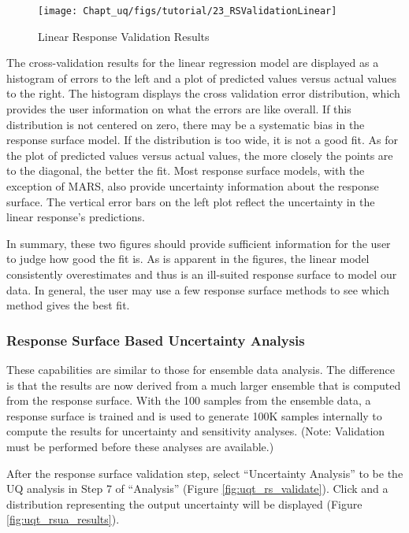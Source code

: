 \begin{figure}[H]
\centering \texttt{[image: Chapt\_uq/figs/tutorial/23\_RSValidationLinear]}
\caption{Linear Response Validation Results}
\label{fig:uqt_rs_validate_results}
\end{figure}

The cross-validation results for the linear regression model are displayed as a histogram of errors to the left and a plot of predicted values versus actual values to the right. The histogram displays the cross validation error distribution, which provides the user information on what the errors are like overall. If this distribution is not centered on zero, there may be a systematic bias in the response surface model. If the distribution is too wide, it is not a good fit. As for the plot of predicted values versus actual values, the more closely the points are to the diagonal, the better the fit. Most response surface models, with the exception of MARS, also provide
uncertainty information about the response surface. The vertical error bars on the left plot reflect the uncertainty in the linear response's predictions.

In summary, these two figures should provide sufficient information for the user to judge how good the fit is. As is apparent in the figures, the linear model consistently overestimates and thus is an ill-suited response surface to model our data. In general, the user may use a few response surface methods to see which method gives the best fit.

\subsubsection{Response Surface Based Uncertainty Analysis}

These capabilities are similar to those for ensemble data analysis. The difference is that the results are now derived from a much larger ensemble that is computed from the response surface. With the 100 samples from the ensemble data, a response surface is trained and is used to generate 100K samples internally to compute the results for uncertainty and sensitivity analyses. (Note: Validation must be performed before these analyses are available.)

After the response surface validation step, select ``Uncertainty Analysis''
to be the UQ analysis in Step 7 of ``Analysis'' (Figure
\ref{fig:uqt_rs_validate}). Click  and a distribution
representing the output uncertainty will be displayed (Figure \ref{fig:uqt_rsua_results}).

